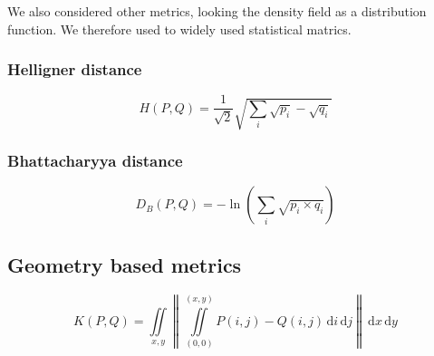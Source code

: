 \documentclass[10pt,a4paper,twoside,twocolumn]{article}
\newcommand*{\rootPath}{../}
\begin{document}
We also considered other metrics, looking the density field as a distribution
function. We therefore used to widely used statistical matrics.

\subsubsection{Helligner distance}
\begin{equation}
	H(P, Q) = \frac{1}{\sqrt{2}}\sqrt{\sum_i \sqrt{p_i} - \sqrt{q_i}}
\end{equation}

\subsubsection{Bhattacharyya distance}
\begin{equation}
	D_B(P, Q) = -\ln{\left(\sum_i \sqrt{p_i \times q_i}\right)}
\end{equation}






\subsection{Geometry based metrics}




\begin{equation}
	K(P, Q) = \iint\limits_{x,y}\left\|
							\iint\limits_{(0,0)}^{(x,y)} P(i,j)-Q(i,j)\,\mathrm{d}i\,\mathrm{d}j
						\right\|\,\mathrm{d}x\,\mathrm{d}y
\end{equation}







\ifstandalone
	
	
\fi
\end{document}
